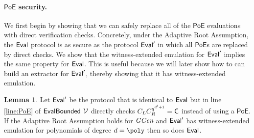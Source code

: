 \documentclass{article}
\theoremstyle{definition}
\newtheorem{lemma}{Lemma}
\begin{document}
\paragraph{$\textsf{PoE}$ security.}
We first begin by showing that we can safely replace all of the $\textsf{PoE}$ evaluations with direct verification checks. Concretely, under the Adaptive Root Assumption, the $\textsf{{Eval}}$ protocol is as secure as the protocol $\textsf{{Eval}}'$ in which all $\textsf{PoE}$s are replaced by direct checks. We show that the witness-extended emulation for $\textsf{{Eval}}'$ implies the same property for $\textsf{{Eval}}$. This is useful because we will later show how to can build an extractor for $\textsf{{Eval}}'$, thereby showing that it has witness-extended emulation.
\begin{lemma} \label{lemma:poe_security}
Let $\textsf{{Eval}}'$ be the protocol that is identical to $\textsf{{Eval}}$ but in line \ref{line:PoE} of $\textsf{{EvalBounded}}$ $\mathcal{V}$ directly checks $C_LC_R^{q^{d'+1}}=\mathsf{C}$ instead of using a $\textsf{PoE}$. If the Adaptive Root Assumption holds for $\textit{GGen}$ and $\textsf{{Eval}}'$ has witness-extended emulation for polynomials of degree $d=\poly$ then so does $\textsf{{Eval}}$.
\end{lemma}
\end{document}
